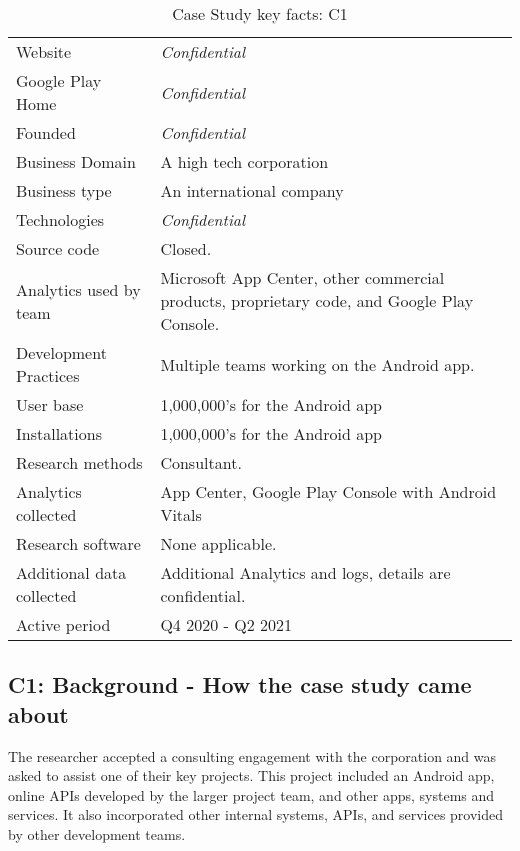 {\renewcommand{\arraystretch}{0.8}%
\begin{table}[htbp!]
    \centering
    \small
    \setlength{\tabcolsep}{1pt}
    \begin{tabular}{lp{9cm}}
       \toprule
       Website &\textit{Confidential} \\
       Google Play Home & \textit{Confidential} \\
       Founded & \textit{Confidential} \\
       Business Domain & A high tech corporation \\
       Business type & An international company \\
       Technologies  & \textit{Confidential} \\
       Source code  &Closed. \\
       Analytics used by team & Microsoft App Center, other commercial products, proprietary code, and Google Play Console. \\
       Development Practices & Multiple teams working on the Android app. \\
       \midrule
       User base & 1,000,000's for the Android app \\
       Installations & 1,000,000's for the Android app \\
       \midrule
       Research methods &Consultant. \\
       Analytics collected &App Center, Google Play Console with Android Vitals \\
       Research software & None applicable. \\
       Additional data collected &Additional Analytics and logs, details are confidential. \\
       Active period & Q4 2020 - Q2 2021 \\
       \bottomrule
    \end{tabular}
    \caption{Case Study key facts: C1}
    \label{tab:blank_case_study_anaytics_overview}
\end{table}
}

\subsection{C1: Background - How the case study came about}
The researcher accepted a consulting engagement with the corporation and was asked to assist one of their key projects. This project included an Android app, online APIs developed by the larger project team, and other apps, systems and services. It also incorporated other internal systems, APIs, and services provided by other development teams. 

